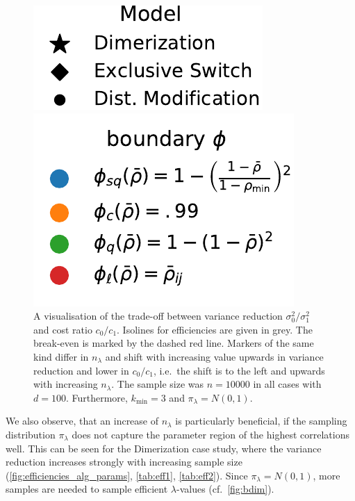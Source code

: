 \begin{figure}[tb]
\begin{minipage}{\textwidth}
    \end{minipage}
    \hfill
    \begin{minipage}{.4\textwidth}
	    \vfill
    \includegraphics[scale=.5]{gfx/legend_models.pdf}
	    \vfill
    \end{minipage}
    \begin{minipage}{.4\textwidth}
	    \vfill
    \includegraphics[scale=.5]{gfx/legend_phi.pdf}
	    \vfill
    \end{minipage}
    \hfill
	\caption[Overview of the cost v.\ variance reduction trade-off]{A visualisation of the trade-off between variance reduction $\sigma_0^2/\sigma_1^2$
    and cost ratio $c_0/c_1$. Isolines for efficiencies are given in grey. The break-even
    is marked by the dashed red line.
    Markers of the same kind differ in $n_{\lambda}$ and shift with increasing value
    upwards in variance reduction and lower in $c_0/c_1$, i.e.\ the shift is to the left and upwards
    with increasing $n_{\lambda}$.
	The sample size was $n=\num{10000}$ in all cases
    with $d=100$. Furthermore, $k_{\min}=3$ and $\pi_\lambda=N(0,1)$.}
    \label{fig:trade_off}
\end{figure}

We also observe, that an increase of $n_{\lambda}$ is particularly beneficial, if
the sampling distribution $\pi_{\lambda}$ does not capture the parameter region of
the highest correlations well.
This can be seen for the Dimerization case study, where the variance reduction increases
strongly with increasing sample size (\autoref{fig:efficiencies_alg_params}, \autoref{tab:eff1}, \autoref{tab:eff2}).
Since $\pi_{\lambda}=N(0,1)$, more samples are needed to sample efficient $\lambda$-values (cf.\ \autoref{fig:bdim}).

